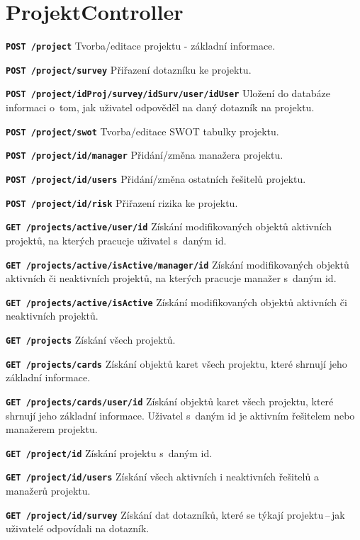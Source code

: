 \section{ProjektController}
\begin{DESCRIPTION}
\item \texttt{\textbf{POST /project}} Tvorba/editace projektu - základní informace.
\item \texttt{\textbf{POST /project/survey}} Přiřazení dotazníku ke projektu.
\item \texttt{\textbf{POST /project/{idProj}/survey/{idSurv}/user/{idUser}}} Uložení do databáze informaci o~tom, jak uživatel odpověděl na daný dotazník na projektu.
\item \texttt{\textbf{POST /project/swot}} Tvorba/editace SWOT tabulky projektu.
\item \texttt{\textbf{POST /project/{id}/manager}} Přidání/změna manažera projektu.
\item \texttt{\textbf{POST /project/{id}/users}} Přidání/změna ostatních řešitelů projektu.
\item \texttt{\textbf{POST /project/{id}/risk}} Přiřazení rizika ke projektu.
\item \texttt{\textbf{GET /projects/active/user/{id}}} Získání modifikovaných objektů aktivních projektů, na kterých pracucje uživatel s~daným id. 
\item \texttt{\textbf{GET /projects/active/{isActive}/manager/{id}}} Získání modifikovaných objektů aktivních či neaktivních projektů, na kterých pracucje manažer s~daným id. 
\item \texttt{\textbf{GET /projects/active/{isActive}}} Získání modifikovaných objektů aktivních či neaktivních projektů.
\item \texttt{\textbf{GET /projects}} Získání všech projektů.
\item \texttt{\textbf{GET /projects/cards}} Získání objektů karet všech projektu, které shrnují jeho základní informace.
\item \texttt{\textbf{GET /projects/cards/user/{id}}} Získání objektů karet všech projektu, které shrnují jeho základní informace. Uživatel s~daným id je aktivním řešitelem nebo manažerem projektu.
\item \texttt{\textbf{GET /project/{id}}} Získání projektu s~daným id.
\item \texttt{\textbf{GET /project/{id}/users}} Získání všech aktivních i neaktivních řešitelů a manažerů projektu.
\item \texttt{\textbf{GET /project/{id}/survey}} Získání dat dotazníků, které se týkají projektu\,--\,jak uživatelé odpovídali na dotazník.

\end{DESCRIPTION}
